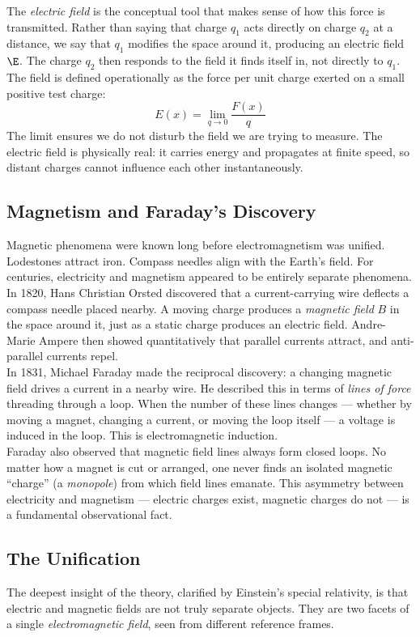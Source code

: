 \documentclass[a4paper]{article}
\begin{document}
The \textit{electric field} is the conceptual tool that makes sense of how this force is transmitted. Rather than saying that charge $q_1$ acts directly on charge $q_2$ at a distance, we say that $q_1$ modifies the space around it, producing an electric field $\E$. The charge $q_2$ then responds to the field it finds itself in, not directly to $q_1$. The field is defined operationally as the force per unit charge exerted on a small positive test charge: $$E(x)=\lim_{q \to 0}\frac{F(x)}{q}$$
The limit ensures we do not disturb the field we are trying to measure. The electric field is physically real: it carries energy and propagates at finite speed, so distant charges cannot influence each other instantaneously. 

\subsection*{Magnetism and Faraday's Discovery}
Magnetic phenomena were known long before electromagnetism was unified. Lodestones attract iron. Compass needles align with the Earth's field. For centuries, electricity and magnetism appeared to be entirely separate phenomena. \\

In 1820, Hans Christian Orsted discovered that a current-carrying wire deflects a compass needle placed nearby. A moving charge produces a \textit{magnetic field} $B$ in the space around it, just as a static charge produces an electric field. Andre-Marie Ampere then showed quantitatively that parallel currents attract, and anti-parallel currents repel. \\

In 1831, Michael Faraday made the reciprocal discovery: a changing magnetic field drives a current in a nearby wire. He described this in terms of \textit{lines of force} threading through a loop. When the number of these lines changes --- whether by moving a magnet, changing a current, or moving the loop itself --- a voltage is induced in the loop. This is electromagnetic induction. \\

Faraday also observed that magnetic field lines always form closed loops. No matter how a magnet is cut or arranged, one never finds an isolated magnetic ``charge'' (a \textit{monopole}) from which field lines emanate. This asymmetry between electricity and magnetism --- electric charges exist, magnetic charges do not --- is a fundamental observational fact. 

\subsection*{The Unification}
The deepest insight of the theory, clarified by Einstein's special relativity, is that electric and magnetic fields are not truly separate objects. They are two facets of a single \textit{electromagnetic field}, seen from different reference frames. \\
\end{document}
